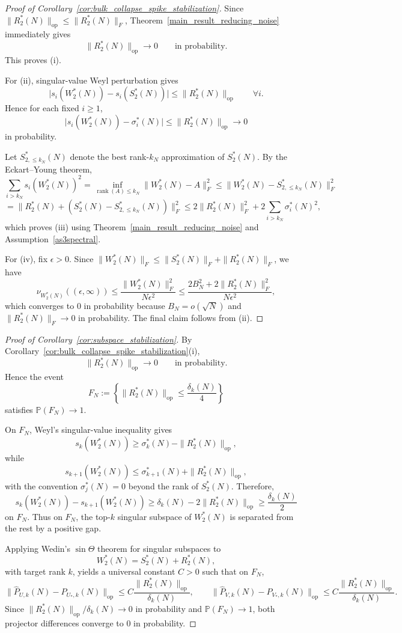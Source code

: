 \documentclass[11pt]{article}
\theoremstyle{plain}
\theoremstyle{definition}
\theoremstyle{remark}
\newcommand{\PP}{\mathbb{P}}
\newcommand{\op}{\mathrm{op}}
\newcommand{\rank}{\operatorname{rank}}
\newcommand{\1}{\mathbf{1}}
\begin{document}
\begin{proof}[Proof of Corollary~\ref{cor:bulk_collapse_spike_stabilization}]
Since \(\|R_2^*(N)\|_{\op}\le \|R_2^*(N)\|_F\), Theorem~\ref{main_result_reducing_noise} immediately gives
\[
\|R_2^*(N)\|_{\op}\to 0
\qquad\text{in probability}.
\]
This proves (i).

For (ii), singular-value Weyl perturbation gives
\[
\big|s_i(W_2^*(N))-s_i(S_2^*(N))\big|
\le
\|R_2^*(N)\|_{\op}
\qquad\forall i.
\]
Hence for each fixed \(i\ge1\),
\[
\big|s_i(W_2^*(N))-\sigma_i^*(N)\big|
\le
\|R_2^*(N)\|_{\op}\to0
\]
in probability.

Let \(S_{2,\le k_N}^*(N)\) denote the best rank-\(k_N\) approximation of \(S_2^*(N)\). By the Eckart--Young theorem,
\[
\sum_{i>k_N} s_i(W_2^*(N))^2
=
\inf_{\rank(A)\le k_N}\|W_2^*(N)-A\|_F^2
\le
\|W_2^*(N)-S_{2,\le k_N}^*(N)\|_F^2
\]
\[
=
\|R_2^*(N)+(S_2^*(N)-S_{2,\le k_N}^*(N))\|_F^2
\le
2\|R_2^*(N)\|_F^2+2\sum_{i>k_N}\sigma_i^*(N)^2,
\]
which proves (iii) using Theorem~\ref{main_result_reducing_noise} and Assumption~\ref{as3spectral}.

For (iv), fix \(\epsilon>0\). Since \(\|W_2^*(N)\|_F\le \|S_2^*(N)\|_F+\|R_2^*(N)\|_F\), we have
\[
\nu_{W_2^*(N)}((\epsilon,\infty))
\le
\frac{\|W_2^*(N)\|_F^2}{N\epsilon^2}
\le
\frac{2B_N^2+2\|R_2^*(N)\|_F^2}{N\epsilon^2},
\]
which converges to \(0\) in probability because \(B_N=o(\sqrt N)\) and \(\|R_2^*(N)\|_F\to0\) in probability. The final claim follows from (ii).
\end{proof}

\begin{proof}[Proof of Corollary~\ref{cor:subspace_stabilization}]
By Corollary~\ref{cor:bulk_collapse_spike_stabilization}(i),
\[
\|R_2^*(N)\|_{\op}\to0
\qquad\text{in probability.}
\]
Hence the event
\[
F_N:=\left\{\|R_2^*(N)\|_{\op}\le \frac{\delta_k(N)}{4}\right\}
\]
satisfies \(\PP(F_N)\to1\).

On \(F_N\), Weyl's singular-value inequality gives
\[
s_k(W_2^*(N))
\ge
\sigma_k^*(N)-\|R_2^*(N)\|_{\op},
\]
while
\[
s_{k+1}(W_2^*(N))
\le
\sigma_{k+1}^*(N)+\|R_2^*(N)\|_{\op},
\]
with the convention \(\sigma_j^*(N)=0\) beyond the rank of \(S_2^*(N)\). Therefore,
\[
s_k(W_2^*(N))-s_{k+1}(W_2^*(N))
\ge
\delta_k(N)-2\|R_2^*(N)\|_{\op}
\ge
\frac{\delta_k(N)}{2}
\]
on \(F_N\). Thus on \(F_N\), the top-\(k\) singular subspace of \(W_2^*(N)\) is separated from the rest by a positive gap.

Applying Wedin's \(\sin\Theta\) theorem for singular subspaces \cite{wedin1972perturbation,stewart1990matrix} to
\[
W_2^*(N)=S_2^*(N)+R_2^*(N),
\]
with target rank \(k\), yields a universal constant \(C>0\) such that on \(F_N\),
\[
\|\widehat P_{U,k}(N)-P_{U_*,k}(N)\|_{\op}
\le
C\frac{\|R_2^*(N)\|_{\op}}{\delta_k(N)},
\qquad
\|\widehat P_{V,k}(N)-P_{V_*,k}(N)\|_{\op}
\le
C\frac{\|R_2^*(N)\|_{\op}}{\delta_k(N)}.
\]
Since \(\|R_2^*(N)\|_{\op}/\delta_k(N)\to0\) in probability and \(\PP(F_N)\to1\), both projector differences converge to \(0\) in probability.
\end{proof}
\end{document}
